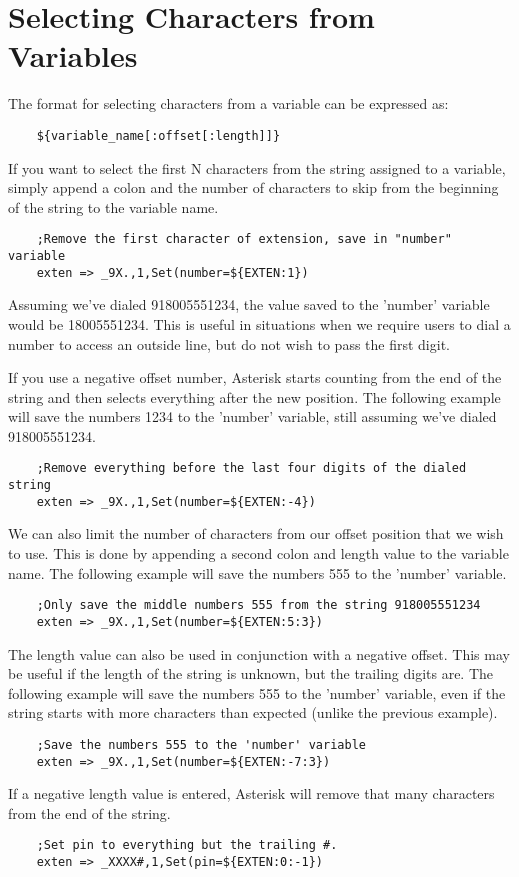\section{Selecting Characters from Variables}

The format for selecting characters from a variable can be expressed as:
\begin{verbatim}
	${variable_name[:offset[:length]]}
\end{verbatim}
If you want to select the first N characters from the string assigned
to a variable, simply append a colon and the number of characters to
skip from the beginning of the string to the variable name.
\begin{verbatim}
	;Remove the first character of extension, save in "number" variable
	exten => _9X.,1,Set(number=${EXTEN:1})
\end{verbatim}
Assuming we've dialed 918005551234, the value saved to the 'number' variable
would be 18005551234. This is useful in situations when we require users to 
dial a number to access an outside line, but do not wish to pass the first 
digit.

If you use a negative offset number, Asterisk starts counting from the end 
of the string and then selects everything after the new position. The following
example will save the numbers 1234 to the 'number' variable, still assuming
we've dialed 918005551234.
\begin{verbatim}
	;Remove everything before the last four digits of the dialed string
	exten => _9X.,1,Set(number=${EXTEN:-4})
\end{verbatim}
We can also limit the number of characters from our offset position that we
wish to use. This is done by appending a second colon and length value to the
variable name. The following example will save the numbers 555 to the 'number'
variable.
\begin{verbatim}
	;Only save the middle numbers 555 from the string 918005551234
	exten => _9X.,1,Set(number=${EXTEN:5:3})
\end{verbatim}
The length value can also be used in conjunction with a negative offset. This
may be useful if the length of the string is unknown, but the trailing digits
are. The following example will save the numbers 555 to the 'number' variable,
even if the string starts with more characters than expected (unlike the
previous example).
\begin{verbatim}
	;Save the numbers 555 to the 'number' variable
	exten => _9X.,1,Set(number=${EXTEN:-7:3})
\end{verbatim}
If a negative length value is entered, Asterisk will remove that many characters
from the end of the string.
\begin{verbatim}
	;Set pin to everything but the trailing #.
	exten => _XXXX#,1,Set(pin=${EXTEN:0:-1})
\end{verbatim}

